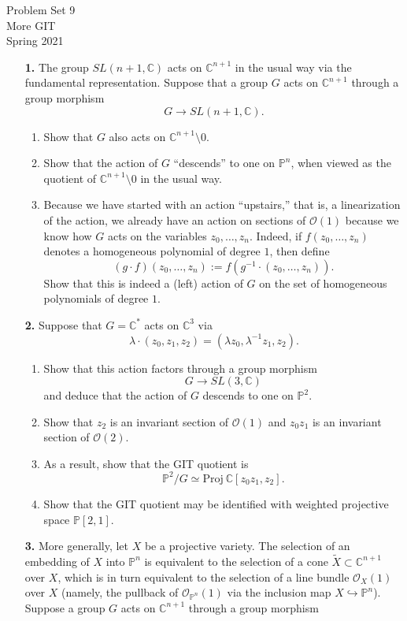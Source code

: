 \documentclass[12pt]{article}
\theoremstyle{definition}
\theoremstyle{theorem}
\begin{document}
\noindent Problem Set 9 \\
\noindent More GIT \\
\noindent Spring 2021

\begin{enumerate}
\item[\textbf{1.}] The group $SL(n+1, \mathbb{C})$ acts on $\mathbb{C}^{n+1}$ in the usual way via the fundamental representation. Suppose that a group $G$ acts on $\mathbb{C}^{n+1}$ through a group morphism 
\[
G \to SL(n+1, \mathbb{C}). 
\]
\begin{enumerate}
\item Show that $G$ also acts on $\mathbb{C}^{n+1} \setminus 0$. 
\item Show that the action of $G$ ``descends'' to one on $\mathbb{P}^n$, when viewed as the quotient of $\mathbb{C}^{n+1} \setminus 0$ in the usual way. 
\item Because we have started with an action ``upstairs,'' that is, a linearization of the action, we already have an action on sections of $\mathcal{O}(1)$ because we know how $G$ acts on the variables $z_0, \ldots, z_n.$ Indeed, if $f(z_0, \ldots, z_n)$ denotes a homogeneous polynomial of degree $1$, then define 
\[
(g \cdot f)(z_0, \ldots, z_n) := f(g^{-1} \cdot (z_0, \ldots, z_n)).
\]
Show that this is indeed a (left) action of $G$ on the set of homogeneous polynomials of degree $1$. 
\end{enumerate}
\item[\textbf{2.}] Suppose that $G = \mathbb{C}^*$ acts on $\mathbb{C}^3$ via 
\[
\lambda \cdot (z_0, z_1, z_2) = (\lambda z_0, \lambda^{-1} z_1, z_2). 
\]
\begin{enumerate}
\item Show that this action factors through a group morphism 
\[
G \to SL(3, \mathbb{C})
\]
and deduce that the action of $G$ descends to one on $\mathbb{P}^2$. 
\item Show that $z_2$ is an invariant section of $\mathcal{O}(1)$ and $z_0z_1$ is an invariant section of $\mathcal{O}(2)$. 
\item As a result, show that the GIT quotient is  
\[
\mathbb{P}^2/G \simeq \text{Proj} \: \mathbb{C}[z_0z_1, z_2].
\]
\item Show that the GIT quotient may be identified with weighted projective space $\mathbb{P}[2,1]$.
\end{enumerate}
\item[\textbf{3.}] More generally, let $X$ be a projective variety. The selection of an embedding of $X$ into $\mathbb{P}^n$ is equivalent to the selection of a cone $\tilde{X} \subset \mathbb{C}^{n+1}$ over $X$, which is in turn equivalent to the selection of a line bundle $\mathcal{O}_X(1)$ over $X$ (namely, the pullback of $\mathcal{O}_{\mathbb{P}^n}(1)$ via the inclusion map $X \hookrightarrow \mathbb{P}^n$). Suppose a group $G$ acts on $\mathbb{C}^{n+1}$ through a group morphism 

\end{enumerate}
\end{document}
